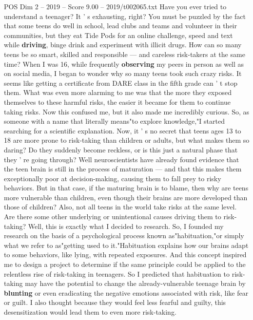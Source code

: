 \begin{textsample}{POS Dim 2 – 2019 – Score 9.00 – 2019/t002065.txt}  \label{ex:f2_pos_039}
Have you ever tried to understand a teenager?
It ' s exhausting, right?
You must be puzzled by the fact that some teens do well in school, lead clubs and teams and volunteer in their communities, but they eat Tide Pods for an online challenge, speed and text while \textbf{driving}, binge drink and experiment with illicit drugs.
How can so many teens be so smart, skilled and responsible — and careless risk-takers at the same time?
When I was 16, while frequently \textbf{observing} my peers in person as well as on social media, I began to wonder why so many teens took such crazy risks.
It seems like getting a certificate from DARE class in the fifth grade can ' t stop them.
What was even more alarming to me was that the more they exposed themselves to these harmful risks, the easier it became for them to continue taking risks.
Now this confused me, but it also made me incredibly curious.
So, as someone with a name that literally means"to explore knowledge,"I started searching for a scientific explanation.
Now, it ' s no secret that teens ages 13 to 18 are more prone to risk-taking than children or adults, but what makes them so daring?
Do they suddenly become reckless, or is this just a natural phase that they ' re going through?
Well neuroscientists have already found evidence that the teen brain is still in the process of maturation — and that this makes them exceptionally poor at decision-making, causing them to fall prey to risky behaviors.
But in that case, if the maturing brain is to blame, then why are teens more vulnerable than children, even though their brains are more developed than those of children?
Also, not all teens in the world take risks at the same level.
Are there some other underlying or unintentional causes driving them to risk- taking?
Well, this is exactly what I decided to research.
So, I founded my research on the basis of a psychological process known as"habituation,"or simply what we refer to as"getting used to it."Habituation explains how our brains adapt to some behaviors, like lying, with repeated exposures.
And this concept inspired me to design a project to determine if the same principle could be applied to the relentless rise of risk-taking in teenagers.
So I predicted that habituation to risk-taking may have the potential to change the already-vulnerable teenage brain by \textbf{blunting} or even eradicating the negative emotions associated with risk, like fear or guilt.
I also thought because they would feel less fearful and guilty, this desensitization would lead them to even more risk-taking.

\end{textsample}

